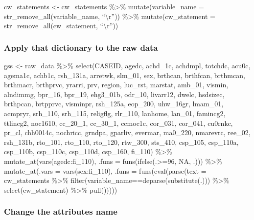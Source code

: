 \documentclass[
]{article}
\begin{document}
cw\_statements \textless- cw\_statements \%\textgreater\%
mutate(variable\_name = str\_remove\_all(variable\_name,
``\textbackslash r'')) \%\textgreater\% mutate(cw\_statement =
str\_remove\_all(cw\_statement, ``\textbackslash r''))

\hypertarget{apply-that-dictionary-to-the-raw-data}{%
\subsubsection{Apply that dictionary to the raw
data}\label{apply-that-dictionary-to-the-raw-data}}

gss \textless- raw\_data \%\textgreater\% select(CASEID, agedc,
achd\_1c, achdmpl, totchdc, acu0c, agema1c, achb1c, rsh\_131a, arretwk,
slm\_01, sex, brthcan, brthfcan, brthmcan, brthmacr, brthprvc, yrarri,
prv, region, luc\_rst, marstat, amb\_01, vismin, alndimmg, bpr\_16,
bpr\_19, ehg3\_01b, odr\_10, livarr12, dwelc, hsdsizec, brthpcan,
brtpprvc, visminpr, rsh\_125a, eop\_200, uhw\_16gr, lmam\_01, acmpryr,
srh\_110, srh\_115, religflg, rlr\_110, lanhome, lan\_01, famincg2,
ttlincg2, noc1610, cc\_20\_1, cc\_30\_1, ccmoc1c, cor\_031, cor\_041,
cu0rnkc, pr\_cl, chh0014c, nochricc, grndpa, gparliv, evermar, ma0\_220,
nmarevrc, ree\_02, rsh\_131b, rto\_101, rto\_110, rto\_120, rtw\_300,
sts\_410, csp\_105, csp\_110a, csp\_110b, csp\_110c, csp\_110d,
csp\_160, fi\_110) \%\textgreater\% mutate\_at(vars(agedc:fi\_110),
.funs = funs(ifelse(.\textgreater=96, NA, .))) \%\textgreater\%
mutate\_at(.vars = vars(sex:fi\_110), .funs = funs(eval(parse(text =
cw\_statements \%\textgreater\%
filter(variable\_name==deparse(substitute(.))) \%\textgreater\%
select(cw\_statement) \%\textgreater\% pull()))))

\hypertarget{change-the-attributes-name}{%
\subsubsection{Change the attributes
name}\label{change-the-attributes-name}}
\end{document}
